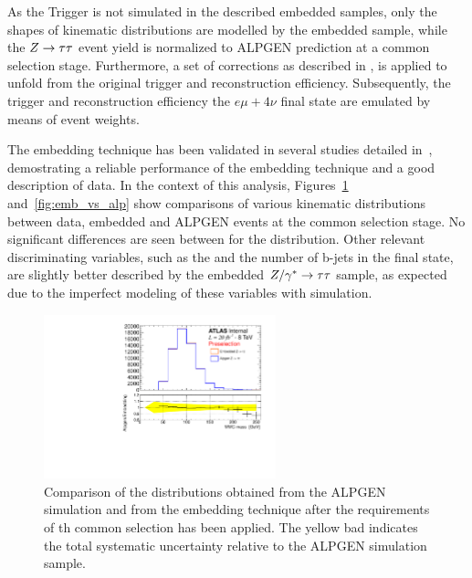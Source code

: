 As the Trigger is not simulated in the described embedded samples, only the shapes of kinematic distributions are modelled by the embedded sample,
while the $Z\rightarrow \tau\tau$ event yield
is normalized to ALPGEN \Ztautau prediction at a common selection stage. Furthermore, a set of corrections as described in \cite{SMnew}, is
applied to unfold from the original \Zmumu trigger and reconstruction efficiency. Subsequently,
the trigger and reconstruction efficiency  the $e \mu +4\nu $ final state are emulated by means of event weights.

The embedding technique has been validated in several studies detailed in~\cite{Embedding, SMnew},  demostrating a reliable performance of the embedding technique
and a good description of data. In the context of this analysis, 
Figures~\ref{fig:emb_vs_alp1} and~\ref{fig:emb_vs_alp} show comparisons of various kinematic distributions between
data, embedded and ALPGEN \Ztautau events at the common selection stage. No significant differences are  seen 
between for the \mmc distribution. 
Other relevant discriminating variables, such as the \MET 
and the number of b-jets in the final state, are slightly better described by the embedded $Z/\gamma^*\rightarrow \tau\tau$ sample, as expected due to the 
imperfect modeling of these variables with simulation.

\begin{figure}[tp]
     \begin{center}

            \includegraphics[page=1, width=0.6\textwidth]{figure/bg_estimation/std_plots_emb.pdf}
\end{center}
    \caption{Comparison of the \mmc distributions obtained from the ALPGEN \Ztautau simulation and from the embedding technique after 
	the requirements of th common selection  has been applied. 
	The yellow bad indicates the total systematic uncertainty  relative to the ALPGEN simulation sample.}
   \label{fig:emb_vs_alp1}
\end{figure}


